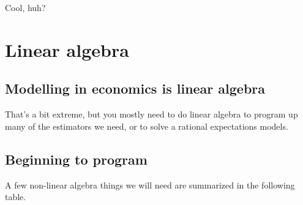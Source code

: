 \documentclass[
  letterpaper,
]{book}
\begin{document}
Cool, huh?

\hypertarget{linear-algebra}{%
\chapter{Linear algebra}\label{linear-algebra}}

\hypertarget{modelling-in-economics-is-linear-algebra}{%
\section{\texorpdfstring{Modelling in economics \textbf{is} linear
algebra}{Modelling in economics is linear algebra}}\label{modelling-in-economics-is-linear-algebra}}

That's a bit extreme, but you mostly need to do linear algebra to
program up many of the estimators we need, or to solve a rational
expectations models.

\hypertarget{beginning-to-program}{%
\section{Beginning to program}\label{beginning-to-program}}

A few non-linear algebra things we will need are summarized in the
following table.
\end{document}
